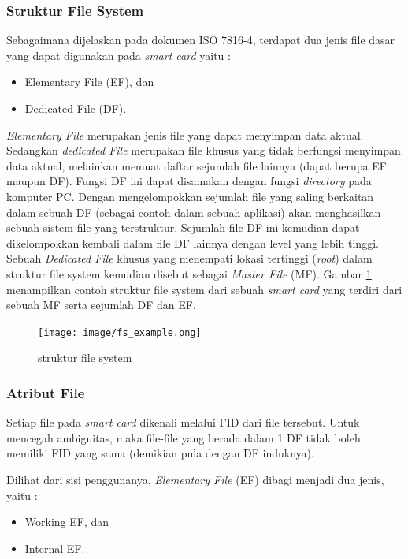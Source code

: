 \subsubsection{Struktur File System}
\label{file-system-structure}

Sebagaimana dijelaskan pada dokumen ISO 7816-4, terdapat dua jenis file dasar yang dapat digunakan pada \textsl{smart card} yaitu :
\begin{itemize}
\item Elementary File (EF), dan
\item Dedicated File (DF).
\end{itemize}

\emph{Elementary File} merupakan jenis file yang dapat menyimpan data aktual. Sedangkan \emph{dedicated File} merupakan file khusus yang tidak berfungsi menyimpan data aktual, melainkan memuat daftar sejumlah file lainnya (dapat berupa EF maupun DF). Fungsi DF ini dapat disamakan dengan fungsi \emph{directory} pada komputer PC. Dengan mengelompokkan sejumlah file yang saling berkaitan dalam sebuah DF (sebagai contoh dalam sebuah aplikasi) akan menghasilkan sebuah sistem file yang terstruktur. Sejumlah file DF ini kemudian dapat dikelompokkan kembali dalam file DF lainnya dengan level yang lebih tinggi. Sebuah \emph{Dedicated File} khusus yang menempati lokasi tertinggi (\emph{root}) dalam struktur file system kemudian disebut sebagai \emph{Master File} (MF). Gambar \ref{fig-fs-example} menampilkan contoh struktur file system dari sebuah \textsl{smart card} yang terdiri dari sebuah MF serta sejumlah DF dan EF.

\begin{figure}
\centering
\texttt{[image: image/fs\_example.png]}
\caption{struktur file system}
\label{fig-fs-example}
\end{figure}

\subsubsection{Atribut File}
\label{file-attribute}

Setiap file pada \textsl{smart card} dikenali melalui FID dari file tersebut. Untuk mencegah ambiguitas, maka file-file yang berada dalam 1 DF tidak boleh memiliki FID yang sama (demikian pula dengan DF induknya). 

Dilihat dari sisi penggunanya, \emph{Elementary File} (EF) dibagi menjadi dua jenis, yaitu :
\begin{itemize}
\item Working EF, dan 
\item Internal EF.
\end{itemize}

